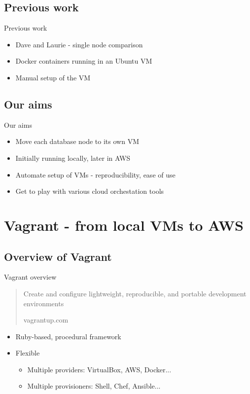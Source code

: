 \documentclass[xcolor=dvipsnames]{beamer}
\begin{document}
\subsection{Previous work}
\begin{frame}{Previous work}
  \begin{itemize}
    \item Dave and Laurie - single node comparison
    \item Docker containers running in an Ubuntu VM
    \item Manual setup of the VM
  \end{itemize}
\end{frame}

\subsection{Our aims}
\begin{frame}{Our aims}
  \begin{itemize}
    \item Move each database node to its own VM
    \item Initially running locally, later in AWS
    \item Automate setup of VMs - reproducibility, ease of use
    \item Get to play with various cloud orchestation tools \smiley
  \end{itemize}
\end{frame}


\section[Vagrant]{Vagrant - from local VMs to AWS}

\subsection{Overview of Vagrant}
\begin{frame}{Vagrant overview}
  \begin{block}{}
    \begin{quote}
      Create and configure lightweight, reproducible, and portable development environments

      \small{\hfill vagrantup.com}
    \end{quote}
  \end{block}
  \pause
  \begin{itemize}
    \item Ruby-based, procedural framework
    \item Flexible
    \begin{itemize}
      \item Multiple providers: VirtualBox, AWS, Docker...
      \item Multiple provisioners: Shell, Chef, Ansible...
    \end{itemize}
  \end{itemize}
\end{frame}
\end{document}
